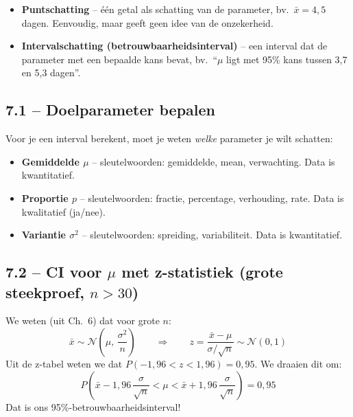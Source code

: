 \documentclass[a4paper,11pt]{article}
\begin{document}
\begin{conceptbox}
\begin{itemize}
  \item \textbf{Puntschatting} -- één getal als schatting van de parameter, bv.\ $\bar{x} = 4{,}5$ dagen. Eenvoudig, maar geeft geen idee van de onzekerheid.
  \item \textbf{Intervalschatting (betrouwbaarheidsinterval)} -- een interval dat de parameter met een bepaalde kans bevat, bv.\ ``$\mu$ ligt met 95\% kans tussen 3{,}7 en 5{,}3 dagen''.
\end{itemize}
\end{conceptbox}

\subsection{7.1 -- Doelparameter bepalen}

Voor je een interval berekent, moet je weten \emph{welke} parameter je wilt schatten:

\begin{conceptbox}
\begin{itemize}
  \item \textbf{Gemiddelde $\mu$} -- sleutelwoorden: gemiddelde, mean, verwachting. Data is kwantitatief.
  \item \textbf{Proportie $p$} -- sleutelwoorden: fractie, percentage, verhouding, rate. Data is kwalitatief (ja/nee).
  \item \textbf{Variantie $\sigma^2$} -- sleutelwoorden: spreiding, variabiliteit. Data is kwantitatief.
\end{itemize}
\end{conceptbox}

\subsection{7.2 -- CI voor \texorpdfstring{$\mu$}{mu} met z-statistiek (grote steekproef, $n>30$)}

\begin{conceptbox}
We weten (uit Ch.\ 6) dat voor grote $n$:
\[\bar{x} \sim \mathcal{N}\!\left(\mu,\, \frac{\sigma^2}{n}\right) \qquad \Rightarrow \qquad z = \frac{\bar{x} - \mu}{\sigma/\sqrt{n}} \sim \mathcal{N}(0,1)\]
Uit de z-tabel weten we dat $P(-1{,}96 < z < 1{,}96) = 0{,}95$. We draaien dit om:
\[P\!\left(\bar{x} - 1{,}96\,\frac{\sigma}{\sqrt{n}} < \mu < \bar{x} + 1{,}96\,\frac{\sigma}{\sqrt{n}}\right) = 0{,}95\]
Dat is ons 95\%-betrouwbaarheidsinterval!
\end{conceptbox}
\end{document}
